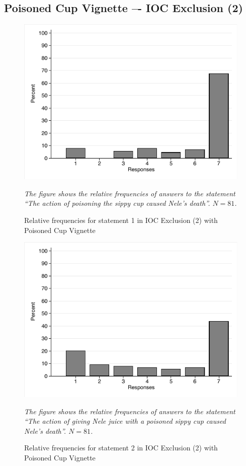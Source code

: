 \documentclass[egregdoesnotlikesansseriftitles,12pt]{scrartcl}
\begin{document}
\subsection{Poisoned Cup Vignette –- IOC Exclusion (2)}
\begin{figure}[H]
   \centering
   \includegraphics[scale=0.8]{figures/cup_ioc_2_hist_1.pdf}
   \begin{minipage}{0.9\linewidth}
   \footnotesize
   \emph{The figure shows the relative frequencies of answers to the statement ``The action of poisoning the sippy cup caused Nele's death''. $N=81$.}
   \end{minipage}
   \caption{Relative frequencies for statement 1 in IOC Exclusion (2) with Poisoned Cup Vignette}
   \label{fig:cup_ioc_2_hist_1}
\end{figure}

\begin{figure}[H]
   \centering
   \includegraphics[scale=0.8]{figures/cup_ioc_2_hist_2.pdf}
   \begin{minipage}{0.9\linewidth}
   \footnotesize
   \emph{The figure shows the relative frequencies of answers to the statement ``The action of giving Nele juice with a poisoned sippy cup caused Nele's death''. $N=81$.}
   \end{minipage}
   \caption{Relative frequencies for statement 2 in IOC Exclusion (2) with Poisoned Cup Vignette}
   \label{fig:cup_ioc_2_hist_2}
\end{figure}
\end{document}
